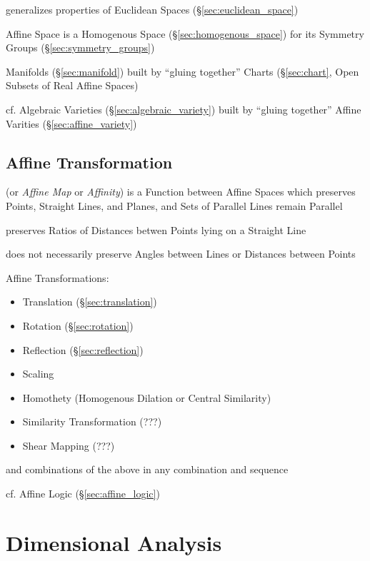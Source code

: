 generalizes properties of Euclidean Spaces (\S\ref{sec:euclidean_space})

Affine Space is a Homogenous Space (\S\ref{sec:homogenous_space}) for its
Symmetry Groups (\S\ref{sec:symmetry_groups})

Manifolds (\S\ref{sec:manifold}) built by ``gluing together'' Charts
(\S\ref{sec:chart}, Open Subsets of Real Affine Spaces)

cf. Algebraic Varieties (\S\ref{sec:algebraic_variety}) built by ``gluing
together'' Affine Varities (\S\ref{sec:affine_variety})



\subsection{Affine Transformation}\label{sec:affine_transformation}

(or \emph{Affine Map} or \emph{Affinity}) is a Function between Affine
Spaces which preserves Points, Straight Lines, and Planes, and Sets of
Parallel Lines remain Parallel

preserves Ratios of Distances betwen Points lying on a Straight Line

does not necessarily preserve Angles between Lines or Distances
between Points

Affine Transformations:
\begin{itemize}
\item Translation (\S\ref{sec:translation})
\item Rotation (\S\ref{sec:rotation})
\item Reflection (\S\ref{sec:reflection})
\item Scaling
\item Homothety (Homogenous Dilation or Central Similarity)
\item Similarity Transformation (???)
\item Shear Mapping (???)
\end{itemize}
and combinations of the above in any combination and sequence

cf. Affine Logic (\S\ref{sec:affine_logic})



\section{Dimensional Analysis}\label{sec:dimensional_analysis}

